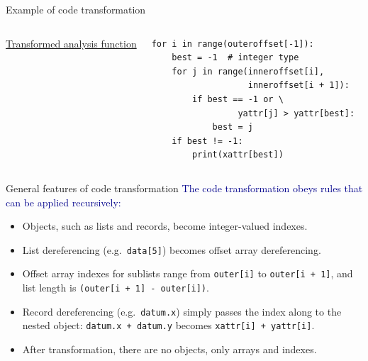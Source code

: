 \documentclass[aspectratio=169]{beamer}
\begin{document}
\begin{frame}[fragile]{Example of code transformation}
\begin{columns}[t]
\underline{\large Transformed analysis function}

\small
\begin{verbatim}
for i in range(outeroffset[-1]):
    best = -1  # integer type
    for j in range(inneroffset[i],
                   inneroffset[i + 1]):
        if best == -1 or \
                 yattr[j] > yattr[best]:
            best = j
    if best != -1:
        print(xattr[best])
\end{verbatim}

\end{columns}
\end{frame}

\begin{frame}{General features of code transformation}
\vspace{0.5 cm}
\large
\textcolor{darkblue}{The code transformation obeys rules that can be applied recursively:}

\vspace{0.1 cm}
\begin{itemize}\setlength{\itemsep}{0.25 cm}
\item Objects, such as lists and records, become integer-valued indexes.
\item List dereferencing (e.g.\ {\tt\normalsize data[5]}) becomes offset array dereferencing.
\item Offset array indexes for sublists range from {\tt\normalsize outer[i]} to {\tt\normalsize outer[i~+~1]}, and list length is {\tt\normalsize (outer[i + 1] - outer[i])}.
\item Record dereferencing (e.g.\ {\tt\normalsize datum.x}) simply passes the index along to the nested object: {\tt\normalsize datum.x + datum.y} becomes {\tt\normalsize xattr[i] + yattr[i]}.
\item After transformation, there are no objects, only arrays and indexes.
\end{itemize}

\normalsize
\vspace{0.25 cm}

\vspace{0.15 cm}
\end{frame}
\end{document}
